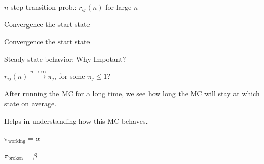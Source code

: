 \begin{frame}{$n$-step transition prob.: $r_{ij}(n)$ for large $n$}

{
\bci
\item<2-> \small Convergence  the start state
\eci


\vspace{-0.3cm}
}
{
\bci
\item<3-> \small Convergence  the start state
\eci


\vspace{-0.3cm}
}


\end{frame}


\begin{frame}{Steady-state behavior: Why Impotant?}

{
\plitemsep 0.1in

\bci
\item $r_{ij}(n) \xrightarrow{n \rightarrow \infty} \pi_j$, for some $\pi_j \le 1$?

\item<2-> 

\item<3-> After running the MC for a long time, we see
  how long the MC will stay at which state on average. 

\item<4-> Helps in understanding how this MC behaves. 

  \eci

}
{

\centering
$\pi_{\text{working}} = \alpha$

\medskip
$\pi_{\text{broken}} = \beta$

}

\end{frame}


